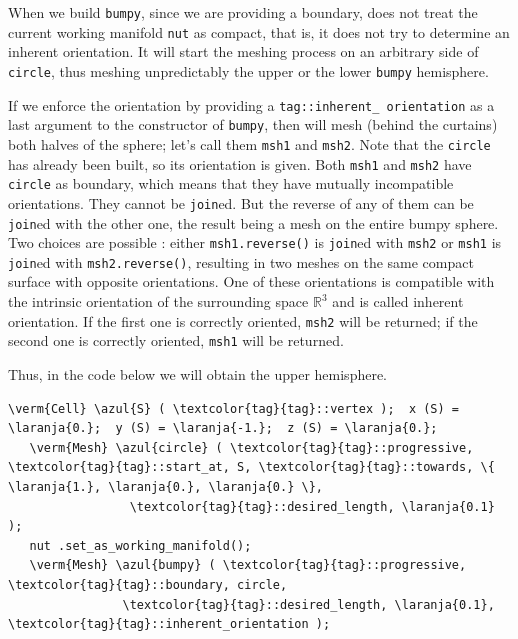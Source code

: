 When we build {\small\tt bumpy}, since we are providing a boundary, {\maniFEM} does not treat
the current working manifold {\small\tt nut} as compact, that is, it does not try to determine an
inherent orientation.
It will start the meshing process on an arbitrary side of {\small\tt circle}, thus meshing
unpredictably the upper or the lower {\small\tt bumpy} hemisphere.

If we enforce the orientation by providing a {\small\tt \textcolor{tag}{tag}::inherent\_\,orientation} as a last
argument to the {\small\tt {}} constructor of {\small\tt bumpy}, then {\maniFEM} will mesh
(behind the curtains) both halves of the sphere; let's call them {\small\tt msh1} and {\small\tt msh2}.
Note that the {\small\tt circle} has already been built, so its orientation is given.
Both {\small\tt msh1} and {\small\tt msh2} have {\small\tt circle} as boundary,
which means that they have mutually incompatible orientations.
They cannot be {\small\tt join}ed.
But the reverse of any of them can be {\small\tt join}ed with the other one, the result being a
mesh on the entire bumpy sphere.
Two choices are possible : either {\small\tt msh1.reverse()} is {\small\tt join}ed with {\small\tt msh2}
or {\small\tt msh1} is {\small\tt join}ed with {\small\tt msh2.reverse()}, resulting in two meshes on
the same compact surface with opposite orientations.
One of these orientations is compatible with the intrinsic orientation of the surrounding space
$ \mathbb{R}^3 $ and is called inherent orientation.
If the first one is correctly oriented, {\small\tt msh2} will be returned;
if the second one is correctly oriented, {\small\tt msh1} will be returned.

Thus, in the code below we will obtain the upper hemisphere.

\begin{Verbatim}[commandchars=\\\{\},formatcom=\small\tt,
   baselinestretch=0.94,framesep=2mm                      ]
   \verm{Cell} \azul{S} ( \textcolor{tag}{tag}::vertex );  x (S) = \laranja{0.};  y (S) = \laranja{-1.};  z (S) = \laranja{0.};
   \verm{Mesh} \azul{circle} ( \textcolor{tag}{tag}::progressive, \textcolor{tag}{tag}::start_at, S, \textcolor{tag}{tag}::towards, \{ \laranja{1.}, \laranja{0.}, \laranja{0.} \},
                 \textcolor{tag}{tag}::desired_length, \laranja{0.1}                                         );
   nut .set_as_working_manifold();
   \verm{Mesh} \azul{bumpy} ( \textcolor{tag}{tag}::progressive, \textcolor{tag}{tag}::boundary, circle,
                \textcolor{tag}{tag}::desired_length, \laranja{0.1}, \textcolor{tag}{tag}::inherent_orientation );
\end{Verbatim}

